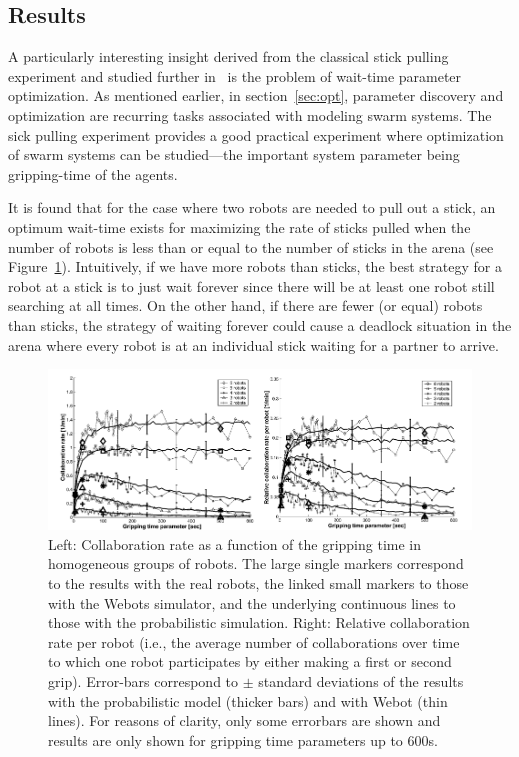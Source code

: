\documentclass[Main.tex]{subfiles}
\begin{document}
\subsection*{Results}
A particularly interesting insight derived from the classical stick pulling experiment and studied further in~\cite{Ijspeert2001} is the problem of wait-time parameter optimization. As mentioned earlier, in section~\ref{sec:opt}, parameter discovery and optimization are recurring tasks associated with modeling swarm systems. The sick pulling experiment provides a good practical experiment where optimization of swarm systems can be studied---the important system parameter being gripping-time of the agents.

It is found that for the case where two robots are needed to pull out a stick, an optimum wait-time exists for maximizing the rate of sticks pulled when the number of robots is less than or equal to the number of sticks in the arena (see Figure~\ref{fig:stickopt}). Intuitively, if we have more robots than sticks, the best strategy for a robot at a stick is to just wait forever since there will be at least one robot still searching at all times. On the other hand, if there are fewer (or equal) robots than sticks, the strategy of waiting forever could cause a deadlock situation in the arena where every robot is at an individual stick waiting for a partner to arrive.

\begin{figure}[!ht]
\centering\includegraphics[width=.85\textwidth]{assets/stickopt.png}
\centering\caption{Left: Collaboration rate as a function of the gripping time in homogeneous groups of robots. The large single markers correspond to the results with the real robots, the linked small markers to those with the Webots simulator, and the underlying continuous lines to those with the probabilistic simulation. Right: Relative collaboration rate per robot (i.e., the average number of collaborations over time to which one robot participates by either making a first or second grip). Error-bars correspond to $\pm$ standard deviations of the results with the probabilistic model (thicker bars) and with Webot (thin lines). For reasons of clarity, only some errorbars are shown and results are only shown for gripping time parameters up to 600s.}\label{fig:stickopt}
\end{figure}
\end{document}
